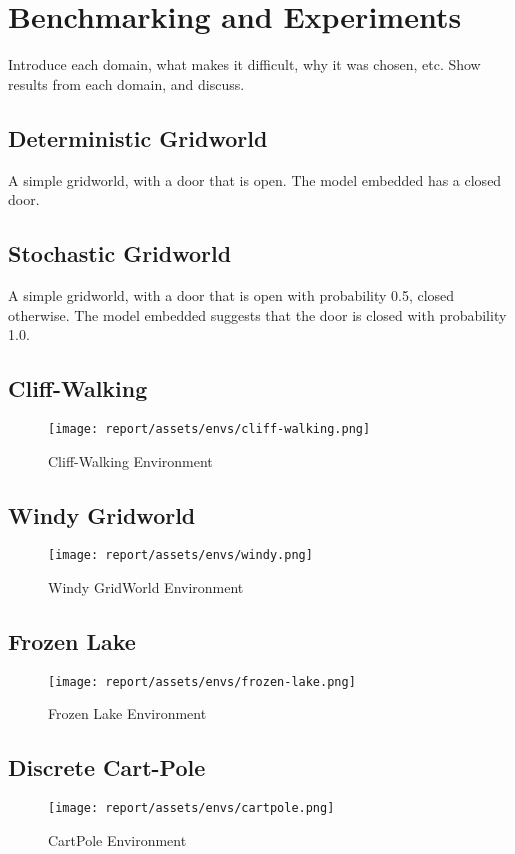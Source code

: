 \chapter{Benchmarking and Experiments}
\label{chapter5}
Introduce each domain, what makes it difficult, why it was chosen, etc. Show results from each domain, and discuss.
\cite{osband2020bsuite, 1606.01540}
\section{Deterministic Gridworld}
A simple gridworld, with a door that is open. The model embedded has a closed door.
\section{Stochastic Gridworld}
A simple gridworld, with a door that is open with probability 0.5, closed otherwise. The model embedded suggests that the door is closed with probability 1.0.
\section{Cliff-Walking}
\begin{figure}[h!]
    \centering
    \texttt{[image: report/assets/envs/cliff-walking.png]}
    \caption{Cliff-Walking Environment \cite{Sutton1998}}
    \label{fig:cliff-walking}
\end{figure}
\cite{1606.01540, Sutton1998}
\section{Windy Gridworld}
\begin{figure}[h!]
    \centering
    \texttt{[image: report/assets/envs/windy.png]}
    \caption{Windy GridWorld Environment \cite{Sutton1998}}
    \label{fig:windy}
\end{figure}
\cite{Sutton1998}
\section{Frozen Lake}
\begin{figure}[h!]
    \centering
    \texttt{[image: report/assets/envs/frozen-lake.png]}
    \caption{Frozen Lake Environment \cite{1606.01540}}
    \label{fig:frozen}
\end{figure}
\cite{1606.01540}
\section{Discrete Cart-Pole}
\begin{figure}[h!]
    \centering
    \texttt{[image: report/assets/envs/cartpole.png]}
    \caption{CartPole Environment \cite{1606.01540, 6313077}}
    \label{fig:cartpole}
\end{figure}
\cite{1606.01540, 6313077}
